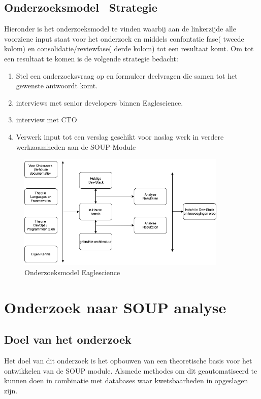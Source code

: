 \subsection{Onderzoeksmodel \ Strategie}
Hieronder is het onderzoeksmodel te vinden waarbij aan de linkerzijde alle voorziene input staat voor het onderzoek en middels confontatie fase( tweede kolom) en consolidatie/reviewfase( derde kolom) tot een resultaat komt. Om tot een resultaat te komen is de volgende strategie bedacht:
\begin{enumerate}
  \item Stel een onderzoeksvraag op en formuleer deelvragen die samen tot het gewenste antwoordt komt.
  \item interviews met senior developers binnen Eaglescience.
  \item interview met CTO
  \item Verwerk input tot een verslag geschikt voor naslag werk in verdere werkzaamheden aan de SOUP-Module
\end{enumerate}
\begin{figure}[h!]
\myfloatalign
\includegraphics[width=10cm]{gfx/OnderzoeksmodelES}
\caption{Onderzoeksmodel Eaglescience}
\label{fig:Onderzoeks model Dev-Stack}
\end{figure}


\section{Onderzoek naar SOUP analyse}
\subsection{Doel van het onderzoek}
Het doel van dit onderzoek is het opbouwen van een theoretische basis voor het ontwikkelen van de SOUP module. Alsmede methodes om dit geautomatiseerd te kunnen doen in combinatie met databases waar kwetsbaarheden in opgeslagen zijn.



